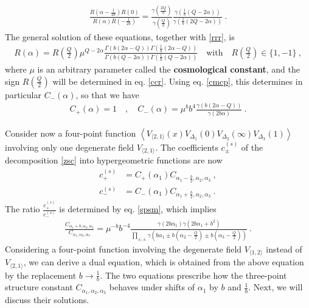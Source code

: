 \documentclass[12pt, a4paper, notitlepage, twoside]{report}
\numberwithin{equation}{section}
\theoremstyle{break}
\begin{document}
\begin{align}
  \frac{R(\alpha-\tfrac{1}{2b})R(0)}{R(\alpha)R(-\tfrac{1}{2b})} = \frac{\gamma(\frac{2Q}{b})}{\gamma(\frac{Q}{b})} \frac{\gamma(\frac{1}{b}(Q-2\alpha))}{\gamma(\frac{1}{b}(2Q-2\alpha))}\ .
\end{align}
The general solution of these equations, together with \eqref{rrr}, is
\begin{align}
 \boxed{R(\alpha) = R(\tfrac{Q}{2})\mu^{Q-2\alpha} \frac{\Gamma(b(2\alpha-Q))\Gamma(\frac{1}{b}(2\alpha-Q))}{\Gamma(b(Q-2\alpha))\Gamma(\frac{1}{b}(Q-2\alpha))}} \quad \text{with} \quad R(\tfrac{Q}{2})\in \{1, -1\}  \ ,
\label{ram}
\end{align}
where $\mu$ is an arbitrary parameter called the \textbf{\boldmath cosmological constant},
and the sign $R(\frac{Q}{2})$ will be determined in eq. \eqref{ccr}.
Using eq. \eqref{cmcp}, this determines in particular $C_-(\alpha)$, so that we have
\begin{align}
 C_+(\alpha)=1 \quad , \quad C_-(\alpha) = \mu^b b^4 \frac{\gamma(b(2\alpha-Q))}{\gamma(2b\alpha)}\ .
\label{cpm}
\end{align}

Consider now a four-point function $\left\langle V_{\langle 2,1 \rangle}(x)V_{\Delta_1}(0)V_{\Delta_2}(\infty)V_{\Delta_3}(1)\right\rangle$ involving only one degenerate field $V_{\langle 2,1 \rangle}$.
The coefficients $c^{(s)}_\pm$ of the decomposition \eqref{zsc} into hypergeometric functions are now 
\begin{align}
 c_+^{(s)} & = C_+(\alpha_1) C_{\alpha_1-\frac{b}{2},\alpha_2,\alpha_3} \ ,
\\
c_-^{(s)} & = C_-(\alpha_1) C_{\alpha_1+\frac{b}{2},\alpha_2,\alpha_3}\ .
\end{align}
The ratio $\frac{c_+^{(s)}}{c_-^{(s)}}$ is determined by eq. \eqref{spsm}, which implies
\begin{align}
 \frac{C_{\alpha_1+b,\alpha_2,\alpha_3}}{C_{\alpha_1,\alpha_2,\alpha_3}} = \mu^{-b} b^{-4}\frac{\gamma(2b\alpha_1)\gamma(2b\alpha_1+b^2)}{\prod_{\pm,\pm} \gamma\left(b\alpha_1\pm b(\alpha_2-\frac{Q}{2})\pm b(\alpha_3-\frac{Q}{2})\right)}\ .
\label{fcc}
\end{align}
Considering a four-point function involving the degenerate field $V_{\langle 1,2 \rangle}$ instead of $V_{\langle 2,1 \rangle}$, we can derive a dual equation, which is obtained from the above equation by the replacement $b\to \frac{1}{b}$. 
The two equations prescribe how the three-point structure constant $C_{\alpha_1,\alpha_2,\alpha_3}$ behaves under shifts of $\alpha_1$ by $b$ and $\frac{1}{b}$.
Next, we will discuss their solutions.
\end{document}
